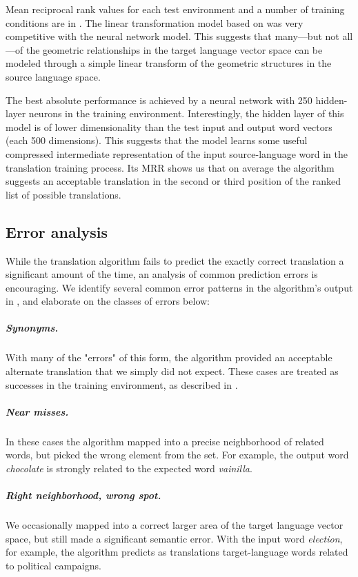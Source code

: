 \documentclass[11pt]{article}
\begin{document}
Mean reciprocal rank values for each test environment and a number of training
conditions are in . The linear transformation model based on
 was very competitive with the neural network
model. This suggests that many---but not all---of the geometric relationships in
the target language vector space can be modeled through a simple linear
transform of the geometric structures in the source language space.

The best absolute performance is achieved by a neural network with 250
hidden-layer neurons in the  training environment. Interestingly, the
hidden layer of this model is of lower dimensionality than the test input and
output word vectors (each 500 dimensions). This suggests that the model learns
some useful compressed intermediate representation of the input source-language
word in the translation training process. Its MRR shows us that on average the
algorithm suggests an acceptable translation in the second or third position of
the ranked list of possible translations.

\subsection{Error analysis}
\label{subsec:error-analysis}

While the translation algorithm fails to predict the exactly correct translation a
significant amount of the time, an analysis of common prediction errors is encouraging.
We identify several common error patterns in the
algorithm's output in , and elaborate on the classes of errors below:

\subparagraph{Synonyms.} With many of the "errors" of this form, the algorithm
provided an acceptable alternate translation that we simply did not expect.
These cases are treated as successes in the  training environment, as
described in .

\subparagraph{Near misses.} In these cases the algorithm mapped into a precise
neighborhood of related words, but picked the wrong element from the set. For
example, the output word \textit{chocolate} is strongly related to the expected
word \textit{vainilla}. %

\subparagraph{Right neighborhood, wrong spot.} We occasionally mapped into a
correct larger area of the target language vector space, but still made a
significant semantic error. With the input word \textit{election}, for example,
the algorithm predicts as translations target-language words related to
political campaigns.
\end{document}
